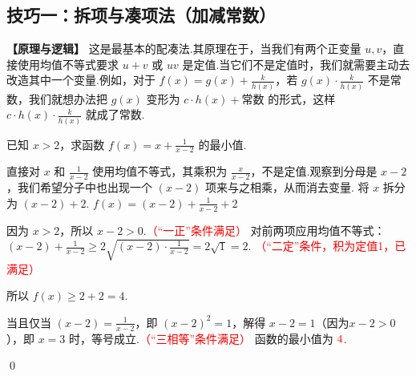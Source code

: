 \subsection{技巧一：拆项与凑项法（加减常数）}

\textbf{【原理与逻辑】}
这是最基本的配凑法.其原理在于，当我们有两个正变量 $u,v$，直接使用均值不等式要求 $u+v$ 或 $uv$ 是定值.当它们不是定值时，我们就需要主动去改造其中一个变量.例如，对于 $f(x)=g(x)+\frac{k}{h(x)}$，若 $g(x) \cdot \frac{k}{h(x)}$ 不是常数，我们就想办法把 $g(x)$ 变形为 $c \cdot h(x) + \text{常数}$ 的形式，这样 $c \cdot h(x) \cdot \frac{k}{h(x)}$ 就成了常数.

\begin{exercise}[基础]
	已知 $x>2$，求函数 $f(x) = x + \frac{1}{x-2}$ 的最小值.
\end{exercise}
\begin{solution}
	\textcolor{green!50!black}{直接对 $x$ 和 $\frac{1}{x-2}$ 使用均值不等式，其乘积为 $\frac{x}{x-2}$，不是定值.观察到分母是 $x-2$，我们希望分子中也出现一个 $(x-2)$ 项来与之相乘，从而消去变量.}
	将 $x$ 拆分为 $(x-2)+2$.
		$f(x) = (x-2) + \frac{1}{x-2} + 2$
		
		因为 $x>2$，所以 $x-2 > 0$.\textcolor{red}{（“一正”条件满足）}
		对前两项应用均值不等式：
		$(x-2) + \frac{1}{x-2} \ge 2\sqrt{(x-2) \cdot \frac{1}{x-2}} = 2\sqrt{1} = 2$.
		\textcolor{red}{（“二定”条件，积为定值1，已满足）}
		
		所以 $f(x) \ge 2+2=4$.

		当且仅当 $(x-2) = \frac{1}{x-2}$，即 $(x-2)^2=1$，解得 $x-2=1$（因为$x-2>0$），即 $x=3$ 时，等号成立.\textcolor{red}{（“三相等”条件满足）}
	函数的最小值为 $\textcolor{red}{4}$.
\end{solution}
\qed

